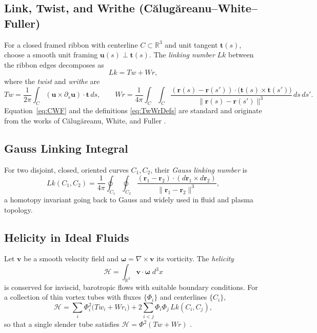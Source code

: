 \documentclass[11pt, a4paper]{article}
\begin{document}
\subsection{Link, Twist, and Writhe (Călugăreanu--White--Fuller)}
For a closed framed ribbon with centerline \(C\subset\mathbb{R}^3\) and unit tangent \(\mathbf t(s)\), choose a smooth unit framing \(\mathbf u(s)\perp \mathbf t(s)\).
The \emph{linking number} \(Lk\) between the ribbon edges decomposes as
\begin{equation}
    Lk = Tw + Wr, \label{eq:CWF}
\end{equation}
where the \emph{twist} and \emph{writhe} are
\begin{equation}
    Tw = \frac{1}{2\pi}\int_C (\mathbf u \times \partial_s \mathbf u)\cdot \mathbf t \, ds, \qquad
    Wr = \frac{1}{4\pi}\int_C\!\!\int_C
    \frac{(\mathbf r(s)-\mathbf r(s'))\cdot\big(\mathbf t(s)\times \mathbf t(s')\big)}
    {\lVert \mathbf r(s)-\mathbf r(s')\rVert^3}\, ds\,ds'. \label{eq:TwWrDefs}
\end{equation}
Equation~\eqref{eq:CWF} and the definitions \eqref{eq:TwWrDefs} are standard and originate from the works of Călugăreanu, White, and Fuller \cite{Calugareanu1959,White1969,Fuller1971}.

\subsection{Gauss Linking Integral}
For two disjoint, closed, oriented curves \(C_1,C_2\), their \emph{Gauss linking number} is
\begin{equation}
    Lk(C_1,C_2) = \frac{1}{4\pi}\oint_{C_1}\!\!\oint_{C_2}
    \frac{(\mathbf r_1-\mathbf r_2)\cdot(d\mathbf r_1\times d\mathbf r_2)}
    {\lVert \mathbf r_1-\mathbf r_2\rVert^3},
    \label{eq:GaussLk}
\end{equation}
a homotopy invariant going back to Gauss and widely used in fluid and plasma topology.

\subsection{Helicity in Ideal Fluids}
Let \(\mathbf v\) be a smooth velocity field and \(\boldsymbol\omega=\nabla\times \mathbf v\) its vorticity. The \emph{helicity}
\begin{equation}
    \mathcal H = \int_{\mathbb{R}^3} \mathbf v\cdot \boldsymbol\omega \; d^3x
    \label{eq:helicity}
\end{equation}
is conserved for inviscid, barotropic flows with suitable boundary conditions. For a collection of thin vortex tubes with fluxes \(\{\Phi_i\}\) and centerlines \(\{C_i\}\),
\begin{equation}
    \mathcal H
    = \sum_{i} \Phi_i^2\big(Tw_i + Wr_i\big)
    + 2\sum_{i<j} \Phi_i\Phi_j\, Lk(C_i,C_j),
    \label{eq:thinTubeHelicity}
\end{equation}
so that a single slender tube satisfies \(\mathcal H = \Phi^2(Tw+Wr)\) \cite{MoffattRicca1992}.
\end{document}
